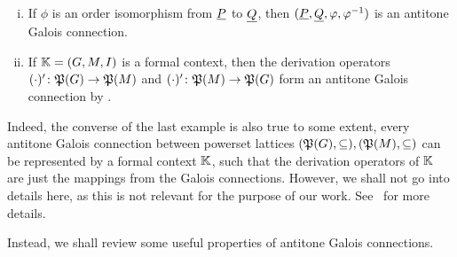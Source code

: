 \begin{Example}
  \begin{enumerate}[i. ]
  \item If $\phi$ is an order isomorphism from ${\underline{P}}$ to ${\underline{Q}}$, then $({\underline{P}}, {\underline{Q}}, \varphi, \varphi^{-1})$ is an antitone Galois connection.
  \item If ${\mathbb{K}} = (G, M, I)$ is a formal context, then the derivation operators
    $(\cdot)' \colon {\ensuremath{\mathfrak{P}(G)}} \to {\ensuremath{\mathfrak{P}(M)}}$ and $(\cdot)' \colon {\ensuremath{\mathfrak{P}(M)}} \to
    {\ensuremath{\mathfrak{P}(G)}}$ form an antitone Galois connection by
    .
  \end{enumerate}
\end{Example}

Indeed, the converse of the last example is also true to some extent, \ie every antitone
Galois connection between powerset lattices $({\mathfrak{P}(G)}, \subseteq), ({\mathfrak{P}(M)},
\subseteq)$ can be represented by a formal context ${\mathbb{K}}$, such that the derivation
operators of ${\mathbb{K}}$ are just the mappings from the Galois connections.  However, we
shall not go into details here, as this is not relevant for the purpose of our work.
See~\cite{fca-book} for more details.

Instead, we shall review some useful properties of antitone Galois connections.

